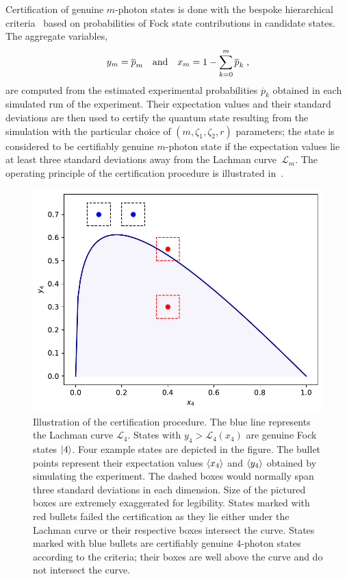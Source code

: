 \documentclass{article}
\begin{document}
Certification of genuine $m$-photon states is done with the bespoke hierarchical criteria~\cite{lachman2019} based on probabilities of Fock state contributions in candidate states. The aggregate variables,
%
\begin{equation}
  y_{m} = \overline{p}_{m} 
  \quad\text{and}\quad
  x_{m} = 1 - \sum_{k = 0}^{m} \overline{p}_{k} 
  \;\text{,}
\end{equation}
%
are computed from the estimated experimental probabilities $\overline{p}_{k}$ obtained in each simulated run of the experiment. Their expectation values and their standard deviations are then used to certify the quantum state resulting from the simulation with the particular choice of $(m, \zeta_{1}, \zeta_{2}, r)$ parameters; the state is considered to be certifiably genuine $m$-photon state if the expectation values lie at least three standard deviations away from the Lachman curve~$\mathcal{L}_{m}$. The operating principle of the certification procedure is illustrated in~.

\begin{figure}[h]
  \begin{center}
    \includegraphics[width = 0.50 \columnwidth]{import/illustrate_lachman_curve.pdf}
  \end{center}
  \caption{
    Illustration of the certification procedure. The blue line represents the Lachman curve $\mathcal{L}_{4}$. States with $y_{4} > \mathcal{L}_{4}(x_{4})$ are genuine Fock states $\ket{4}$. Four example states are depicted in the figure. The bullet points represent their expectation values $\langle x_{4} \rangle$ and $\langle y_{4} \rangle$ obtained by simulating the experiment. The dashed boxes would normally span three standard deviations in each dimension. Size of the pictured boxes are extremely exaggerated for legibility. States marked with red bullets failed the certification as they lie either under the Lachman curve or their respective boxes intersect the curve. States marked with blue bullets are certifiably genuine $4$-photon states according to the criteria; their boxes are well above the curve and do not intersect the curve.
  }
  \label{f-otm-il}
\end{figure}
\end{document}
